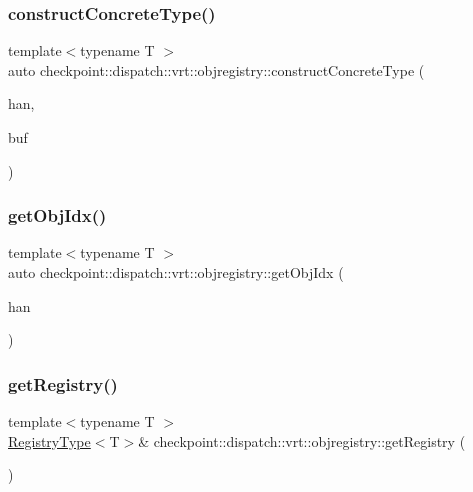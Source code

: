 \subsubsection{\texorpdfstring{construct\+Concrete\+Type()}{constructConcreteType()}}
{\footnotesize\ttfamily template$<$typename T $>$ \\
auto checkpoint\+::dispatch\+::vrt\+::objregistry\+::construct\+Concrete\+Type (\begin{DoxyParamCaption}\item[{\hyperlink{namespacecheckpoint_1_1dispatch_1_1vrt_acd3f9e6b091bcfbc23dc35ea8ef45d3b}{Type\+Idx}}]{han,  }\item[{void $\ast$}]{buf }\end{DoxyParamCaption})\hspace{0.3cm}{\ttfamily [inline]}}

\mbox{\label{namespacecheckpoint_1_1dispatch_1_1vrt_1_1objregistry_a76f3c63243a48165f3e03b90837e2e8a}} 
\subsubsection{\texorpdfstring{get\+Obj\+Idx()}{getObjIdx()}}
{\footnotesize\ttfamily template$<$typename T $>$ \\
auto checkpoint\+::dispatch\+::vrt\+::objregistry\+::get\+Obj\+Idx (\begin{DoxyParamCaption}\item[{\hyperlink{namespacecheckpoint_1_1dispatch_1_1vrt_acd3f9e6b091bcfbc23dc35ea8ef45d3b}{Type\+Idx}}]{han }\end{DoxyParamCaption})\hspace{0.3cm}{\ttfamily [inline]}}

\mbox{\label{namespacecheckpoint_1_1dispatch_1_1vrt_1_1objregistry_acf7bcbb09d5efae1e40034dec911d4c1}} 
\subsubsection{\texorpdfstring{get\+Registry()}{getRegistry()}}
{\footnotesize\ttfamily template$<$typename T $>$ \\
\hyperlink{namespacecheckpoint_1_1dispatch_1_1vrt_1_1objregistry_a052bc9d365db250a655ce65d920c5980}{Registry\+Type}$<$T$>$\& checkpoint\+::dispatch\+::vrt\+::objregistry\+::get\+Registry (\begin{DoxyParamCaption}{ }\end{DoxyParamCaption})\hspace{0.3cm}{\ttfamily [inline]}}

